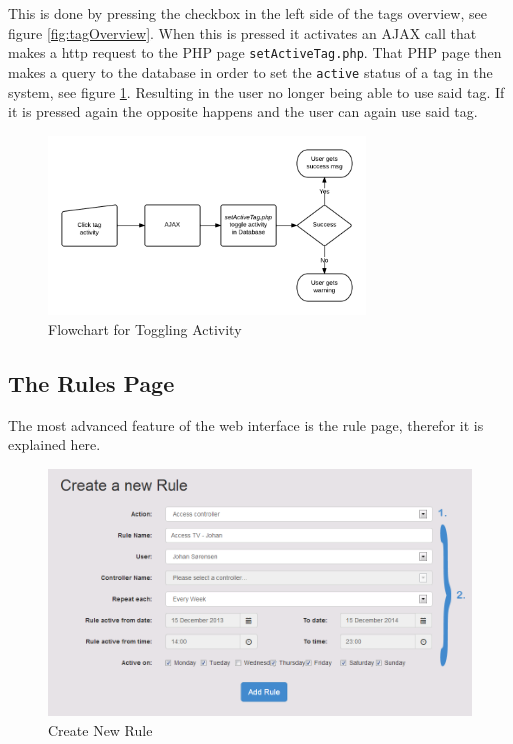 This is done by pressing the checkbox in the left side of the tags overview, see figure \ref{fig:tagOverview}. When this is pressed it activates an AJAX call that makes a http request to the PHP page \texttt{setActiveTag.php}. That PHP page then makes a query to the database in order to set the \texttt{active} status of a tag in the system, see figure \ref{fig:flowChartTagActivity}. Resulting in the user no longer being able to use said tag. If it is pressed again the opposite happens and the user can again use said tag.


\begin{figure}[htbp]
	\centering
		\includegraphics[width=0.75\textwidth]{images/flowChartTagActivity.png}
	\caption{Flowchart for Toggling Activity}
	\label{fig:flowChartTagActivity}
\end{figure}


\subsection{The Rules Page}
\label{subsec:rulesWEB}
The most advanced feature of the web interface is the rule page, therefor it is explained here.

\begin{figure}[htbp]
	\centering
		\includegraphics[width=1.00\textwidth]{images/createNewRule.png}
	\caption{Create New Rule}
	\label{fig:createNewRule}
\end{figure}

